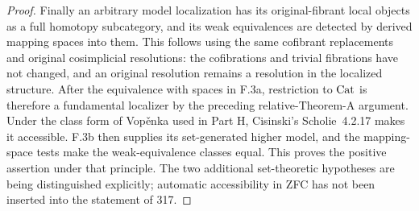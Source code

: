 \begin{proof}
Finally an arbitrary model localization has its original-fibrant
local objects as a full homotopy subcategory, and its weak
equivalences are detected by derived mapping spaces into them.
This follows using the same cofibrant replacements and original
cosimplicial resolutions: the cofibrations and trivial fibrations
have not changed, and an original resolution remains a resolution
in the localized structure. After the equivalence with spaces in
F.3a, restriction to $\mathrm{Cat}$ is therefore a fundamental localizer
by the preceding relative-Theorem-A argument. Under the class
form of Vop\v{e}nka used in Part H, Cisinski's Scholie~4.2.17
makes it accessible. F.3b then supplies its set-generated higher
model, and the mapping-space tests make the weak-equivalence
classes equal. This proves the positive assertion under that
principle. The two additional set-theoretic hypotheses are being
distinguished explicitly; automatic accessibility in ZFC has not
been inserted into the statement of 317.
\end{proof}

